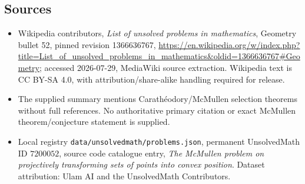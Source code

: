 \documentclass[11pt]{article}
\begin{document}
\subsection{Sources}
\begin{itemize}
\item Wikipedia contributors, \emph{List of unsolved problems in mathematics}, Geometry bullet 52, pinned revision 1366636767, \url{https://en.wikipedia.org/w/index.php?title=List_of_unsolved_problems_in_mathematics&oldid=1366636767#Geometry}; accessed 2026-07-29, MediaWiki source extraction. Wikipedia text is CC BY-SA 4.0, with attribution/share-alike handling required for release.
\item The supplied summary mentions Carath\'eodory/McMullen selection theorems without full references. No authoritative primary citation or exact McMullen theorem/conjecture statement is supplied.
\item Local registry \texttt{data/unsolvedmath/problems.json}, permanent UnsolvedMath ID $7200052$, source code catalogue entry, \emph{The McMullen problem on projectively transforming sets of points into convex position}. Dataset attribution: Ulam AI and the UnsolvedMath Contributors.
\end{itemize}
\end{document}
